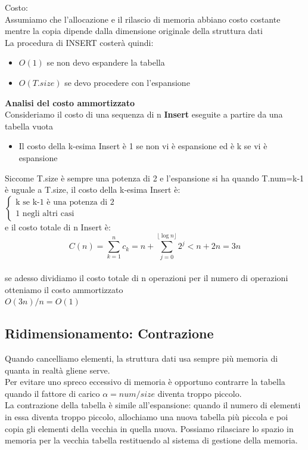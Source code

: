 \noindent Costo:\\
Assumiamo che l'allocazione e il rilascio di memoria abbiano costo costante mentre la copia dipende dalla dimensione originale della struttura dati\\
La procedura di INSERT costerà quindi:\\
\begin{itemize}
    \item $O(1)$ se non devo espandere la tabella
    \item $O(T.size)$ se devo procedere con l'espansione
\end{itemize}
\noindent \textbf{Analisi del costo ammortizzato}\\
Consideriamo il costo di una sequenza di n \textbf{Insert} eseguite a partire da una tabella vuota\\
\begin{itemize}
    \item Il costo della k-esima Insert è 1 se non vi è espansione ed è k se vi è espansione
\end{itemize}
\noindent Siccome T.size è sempre una potenza di 2 e l'espansione si ha quando T.num=k-1 è uguale a T.size, il costo della k-esima Insert è:\medskip\\
$\begin{cases}
\text{k se k-1 è una potenza di 2} \\
\text{1 negli altri casi}
\end{cases}$\medskip\\
\noindent e il costo totale di n Insert è:\\
$$C(n)=\sum_{k=1}^n c_k=n+\sum_{j=0}^{\lfloor \log n \rfloor}2^j<n+2n=3n$$\\
\noindent se adesso dividiamo il costo totale di n operazioni per il numero di operazioni otteniamo il costo ammortizzato\\
$O(3n)/n=O(1)$
\subsection{Ridimensionamento: Contrazione}
Quando cancelliamo elementi, la struttura dati usa sempre più memoria di quanta in realtà gliene serve.\\
Per evitare uno spreco eccessivo di memoria è opportuno contrarre la tabella quando il fattore di carico $\alpha = num/size$ diventa troppo piccolo.\\
La contrazione della tabella è simile all'espansione: quando il numero di elementi in essa diventa troppo piccolo, allochiamo una nuova tabella più piccola e poi copia gli elementi della vecchia in quella nuova. Possiamo rilasciare lo spazio in memoria per la vecchia tabella restituendo al sistema di gestione della memoria.
